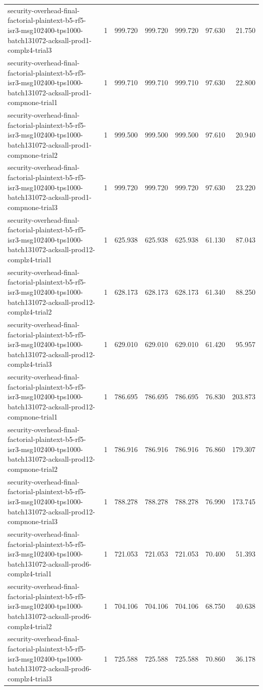 \begin{tabular}{lrrrrrr}
security-overhead-final-factorial-plaintext-b5-rf5-isr3-msg102400-tps1000-batch131072-acksall-prod1-complz4-trial3 & 1 & 999.720 & 999.720 & 999.720 & 97.630 & 21.750 \\
security-overhead-final-factorial-plaintext-b5-rf5-isr3-msg102400-tps1000-batch131072-acksall-prod1-compnone-trial1 & 1 & 999.710 & 999.710 & 999.710 & 97.630 & 22.800 \\
security-overhead-final-factorial-plaintext-b5-rf5-isr3-msg102400-tps1000-batch131072-acksall-prod1-compnone-trial2 & 1 & 999.500 & 999.500 & 999.500 & 97.610 & 20.940 \\
security-overhead-final-factorial-plaintext-b5-rf5-isr3-msg102400-tps1000-batch131072-acksall-prod1-compnone-trial3 & 1 & 999.720 & 999.720 & 999.720 & 97.630 & 23.220 \\
security-overhead-final-factorial-plaintext-b5-rf5-isr3-msg102400-tps1000-batch131072-acksall-prod12-complz4-trial1 & 1 & 625.938 & 625.938 & 625.938 & 61.130 & 87.043 \\
security-overhead-final-factorial-plaintext-b5-rf5-isr3-msg102400-tps1000-batch131072-acksall-prod12-complz4-trial2 & 1 & 628.173 & 628.173 & 628.173 & 61.340 & 88.250 \\
security-overhead-final-factorial-plaintext-b5-rf5-isr3-msg102400-tps1000-batch131072-acksall-prod12-complz4-trial3 & 1 & 629.010 & 629.010 & 629.010 & 61.420 & 95.957 \\
security-overhead-final-factorial-plaintext-b5-rf5-isr3-msg102400-tps1000-batch131072-acksall-prod12-compnone-trial1 & 1 & 786.695 & 786.695 & 786.695 & 76.830 & 203.873 \\
security-overhead-final-factorial-plaintext-b5-rf5-isr3-msg102400-tps1000-batch131072-acksall-prod12-compnone-trial2 & 1 & 786.916 & 786.916 & 786.916 & 76.860 & 179.307 \\
security-overhead-final-factorial-plaintext-b5-rf5-isr3-msg102400-tps1000-batch131072-acksall-prod12-compnone-trial3 & 1 & 788.278 & 788.278 & 788.278 & 76.990 & 173.745 \\
security-overhead-final-factorial-plaintext-b5-rf5-isr3-msg102400-tps1000-batch131072-acksall-prod6-complz4-trial1 & 1 & 721.053 & 721.053 & 721.053 & 70.400 & 51.393 \\
security-overhead-final-factorial-plaintext-b5-rf5-isr3-msg102400-tps1000-batch131072-acksall-prod6-complz4-trial2 & 1 & 704.106 & 704.106 & 704.106 & 68.750 & 40.638 \\
security-overhead-final-factorial-plaintext-b5-rf5-isr3-msg102400-tps1000-batch131072-acksall-prod6-complz4-trial3 & 1 & 725.588 & 725.588 & 725.588 & 70.860 & 36.178 \\

\end{tabular}
